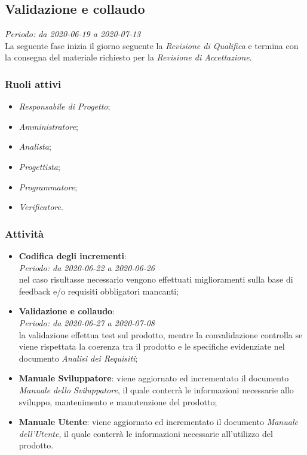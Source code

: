 \subsection{Validazione e collaudo}
\textit{Periodo: da 2020-06-19 a 2020-07-13}\\
La seguente fase inizia il giorno seguente la \textit{Revisione di Qualifica} e termina con la consegna del materiale richiesto per la \textit{Revisione di Accettazione}.

\subsubsection{Ruoli attivi} \begin{itemize}
\item \textit{Responsabile di Progetto};
\item \textit{Amministratore};
\item \textit{Analista};
\item \textit{Progettista};
\item \textit{Programmatore};
\item \textit{Verificatore}.
\end{itemize}

\subsubsection{Attività}
\begin{itemize}
\item \textbf{Codifica degli incrementi}:\\
\textit{Periodo: da 2020-06-22 a 2020-06-26} \\
nel caso risultasse necessario vengono effettuati miglioramenti sulla base di feedback e/o requisiti obbligatori mancanti;
\item \textbf{Validazione e collaudo}: \\
\textit{Periodo: da 2020-06-27 a 2020-07-08} \\
la validazione effettua test sul prodotto, mentre la convalidazione controlla se viene rispettata la coerenza tra il prodotto e le specifiche evidenziate nel documento \textit{Analisi dei Requisiti};
\item \textbf{Manuale Sviluppatore}: viene aggiornato ed incrementato il documento \textit{Manuale dello Sviluppatore}, il quale conterrà le informazioni necessarie allo sviluppo, mantenimento e manutenzione del prodotto;
\item \textbf{Manuale Utente}: viene aggiornato ed incrementato il documento \textit{Manuale dell'Utente}, il quale conterrà le informazioni necessarie all'utilizzo del prodotto.
\end{itemize}

